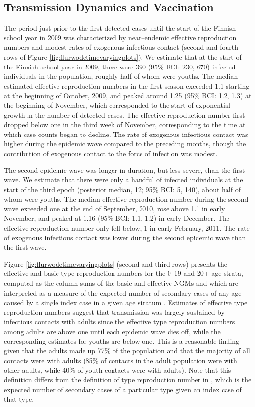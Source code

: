 \subsection{Transmission Dynamics and Vaccination}
\label{flu_res_dynamics}

The period just prior to the first detected cases until the start of the Finnish school year in 2009 was characterized by near--endemic effective reproduction numbers and modest rates of exogenous infectious contact (second and fourth rows of Figure \ref{fig:flurwodetimevaryingplots}). We estimate that at the start of the Finnish school year in 2009, there were 390 (95\% BCI: 230, 670) infected individuals in the population, roughly half of whom were youths. The median estimated effective reproduction numbers in the first season exceeded 1.1 starting at the beginning of October, 2009, and peaked around 1.25 (95\% BCI: 1.2, 1.3) at the beginning of November, which corresponded to the start of exponential growth in the number of detected cases. The effective reproduction number first dropped below one in the third week of November, corresponding to the time at which case counts began to decline. The rate of exogenous infectious contact was higher during the epidemic wave compared to the preceding months, though the contribution of exogenous contact to the force of infection was modest. 

The second epidemic wave was longer in duration, but less severe, than the first wave. We estimate that there were only a handful of infected individuals at the start of the third epoch (posterior median, 12; 95\% BCI: 5, 140), about half of whom were youths. The median effective reproduction number during the second wave exceeded one at the end of September, 2010, rose above 1.1 in early November, and peaked at 1.16 (95\% BCI: 1.1, 1.2) in early December. The effective reproduction number only fell below, 1 in early February, 2011. The rate of exogenous infectious contact was lower during the second epidemic wave than the first wave. 
 
Figure \ref{fig:flurwodetimevaryingplots} (second and third rows) presents the effective and basic type reproduction numbers for the 0--19 and 20+ age strata, computed as the column sums of the basic and effective NGMs and which are interpreted as a measure of the expected number of secondary cases of any age caused by a single index case in a given age stratum \cite{glass2011estimating}. Estimates of effective type reproduction numbers suggest that transmission was largely sustained by infectious contacts with adults since the effective type reproduction numbers among adults are above one until each epidemic wave dies off, while the corresponding estimates for youths are below one. This is a reasonable finding given that the adults made up 77\% of the population and that the majority of all contacts were with adults (85\% of contacts in the adult population were with other adults, while 40\% of youth contacts were with adults). Note that this definition differs from the definition of type reproduction number in \cite{heesterbeek2007type}, which is the expected number of secondary cases of a particular type given an index case of that type.

